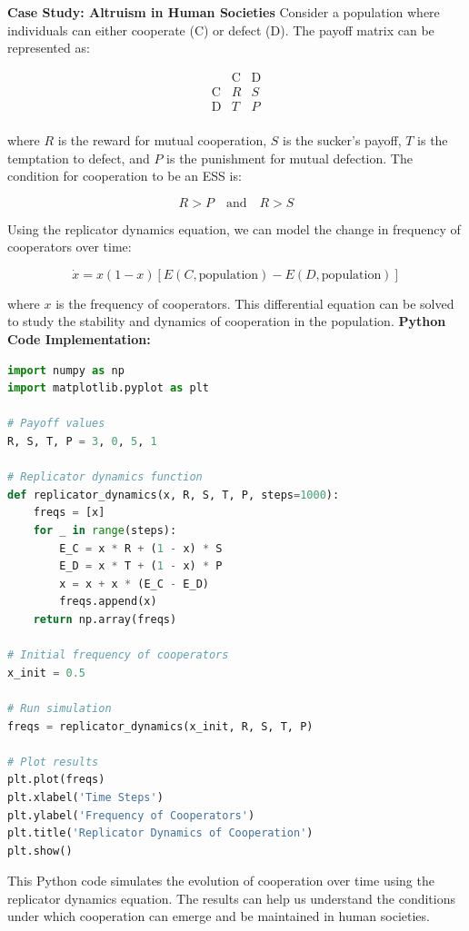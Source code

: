 \documentclass[12pt]{book} %
\begin{document}
\textbf{Case Study: Altruism in Human Societies}
Consider a population where individuals can either cooperate (C) or defect (D). The payoff matrix can be represented as:

\[
\begin{array}{c|cc}
 & \text{C} & \text{D} \\
\hline
\text{C} & R & S \\
\text{D} & T & P \\
\end{array}
\]

where \( R \) is the reward for mutual cooperation, \( S \) is the sucker's payoff, \( T \) is the temptation to defect, and \( P \) is the punishment for mutual defection. The condition for cooperation to be an ESS is:

\[
R > P \quad \text{and} \quad R > S
\]

Using the replicator dynamics equation, we can model the change in frequency of cooperators over time:

\[
\dot{x} = x (1 - x) \left[ E(C, \text{population}) - E(D, \text{population}) \right]
\]

where \( x \) is the frequency of cooperators. This differential equation can be solved to study the stability and dynamics of cooperation in the population.
\FloatBarrier
\textbf{Python Code Implementation:}
\FloatBarrier
\begin{lstlisting}[language=Python, caption=Replicator Dynamics Simulation]
import numpy as np
import matplotlib.pyplot as plt

# Payoff values
R, S, T, P = 3, 0, 5, 1

# Replicator dynamics function
def replicator_dynamics(x, R, S, T, P, steps=1000):
    freqs = [x]
    for _ in range(steps):
        E_C = x * R + (1 - x) * S
        E_D = x * T + (1 - x) * P
        x = x + x * (E_C - E_D)
        freqs.append(x)
    return np.array(freqs)

# Initial frequency of cooperators
x_init = 0.5

# Run simulation
freqs = replicator_dynamics(x_init, R, S, T, P)

# Plot results
plt.plot(freqs)
plt.xlabel('Time Steps')
plt.ylabel('Frequency of Cooperators')
plt.title('Replicator Dynamics of Cooperation')
plt.show()
\end{lstlisting}
\FloatBarrier

This Python code simulates the evolution of cooperation over time using the replicator dynamics equation. The results can help us understand the conditions under which cooperation can emerge and be maintained in human societies.
\end{document}
